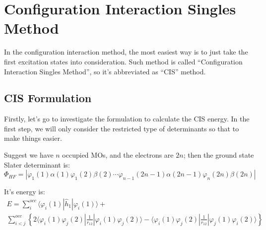 %
%
%
%
%
%
%



\chapter{Configuration Interaction Singles Method}
%
%
%
%
In the configuration interaction method, the most easiest way is to just take
the first excitation states into consideration. Such method is called
``Configuration Interaction Singles Method'', so it's abbreviated as
``CIS'' method.

\section{CIS Formulation}
%
%
%
%
Firstly, let's go to investigate the formulation to calculate the CIS
energy. In the first step, we will only consider the restricted type
of determinants so that to make things easier. 

Suggest we have $n$ occupied MOs, and the electrons are $2n$; then the
ground state Slater determinant is:
\begin{equation}
  \label{eq:CISeq:1}
  \Phi_{HF} =  |\varphi_{1}(1)\alpha(1)\varphi_{1}(2)\beta(2)\cdots
\varphi_{n-1}(2n-1)\alpha(2n-1)\varphi_{n}(2n)\beta(2n)|  
\end{equation}

It's energy is:
\begin{multline}\label{CISeq:2}
  E
  =\sum_{i}^{occ}\langle\varphi_{i}(1)|\hat{h}_{1}|\varphi_{i}(1)\rangle
  +  \\
  \sum_{i < j}^{occ} \left\{
    2\langle\varphi_{i}(1)\varphi_{j}(2)|\frac{1}{r_{12}}|\varphi_{i}(1)\varphi_{j}(2)\rangle-
    \langle\varphi_{i}(1)\varphi_{j}(2)|\frac{1}{r_{12}}|\varphi_{j}(1)\varphi_{i}(2)\rangle
  \right\}
\end{multline}

